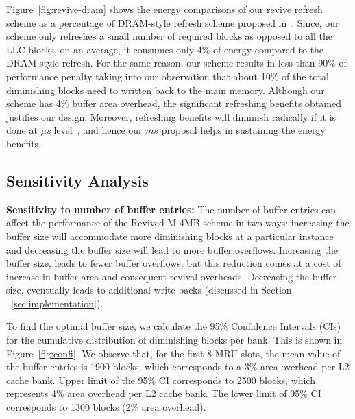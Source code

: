Figure~\ref{fig:revive-dram} shows the energy comparisons of our revive refresh scheme as a percentage of
DRAM-style refresh scheme proposed in~\cite{STTRAM:HPCA11}. Since, our scheme only refreshes a small
number of required blocks as opposed to all the LLC blocks, on an average, it consumes only 4\% of energy compared
to the DRAM-style refresh. For the same reason, our scheme results in less than 90\% of performance penalty taking into our observation that about 10\% of the total diminishing blocks need to written back to the main memory. Although our scheme has 4\% buffer area overhead, the significant refreshing benefits obtained justifies our design. Moreover, refreshing benefits will diminish radically if it is done at {\it $\mu$s} level~\cite{STTRAM:HPCA11}, and hence our $ms$ proposal helps in sustaining the energy benefits.


\subsection{Sensitivity Analysis}
\noindent\textbf{Sensitivity to number of buffer entries:}
The number of buffer entries can affect the performance of the Revived-M-4MB scheme in two ways: increasing the
buffer size will accommodate more diminishing blocks at a particular instance and decreasing the buffer size will
lead to more buffer overflows. Increasing the buffer size, leads to fewer buffer overflows,
but this reduction comes at a cost of increase in buffer area and consequent revival overheads. Decreasing the buffer size, eventually leads to additional write backs (discussed in Section ~\ref{sec:implementation}).





To find the optimal buffer size, we calculate the 95\% Confidence Intervals (CIs) for the cumulative distribution of
diminishing blocks per bank. This is shown in Figure~\ref{fig:confi}. We observe that, for the first 8 MRU slots, the
mean value of the buffer entries is 1900 blocks, which corresponds to a 3\% area overhead per L2 cache bank.
Upper limit of the 95\% CI corresponds to 2500 blocks,  which represents 4\% area overhead per L2 cache bank.
The lower limit of 95\% CI corresponds to 1300 blocks (2\% area overhead).

